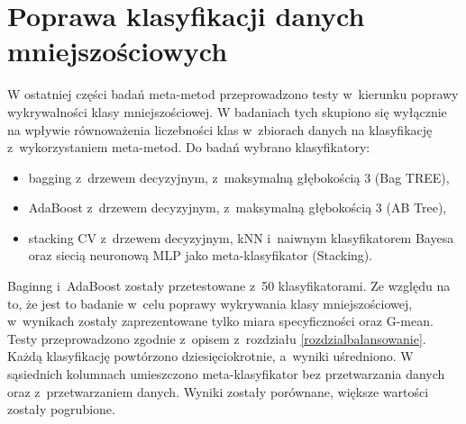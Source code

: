 \section{Poprawa klasyfikacji danych mniejszościowych}
W ostatniej części badań meta-metod przeprowadzono testy w~kierunku poprawy wykrywalności klasy mniejszościowej. W badaniach tych skupiono się wyłącznie na wpływie równoważenia liczebności klas w~zbiorach danych na klasyfikację z~wykorzystaniem meta-metod. Do badań wybrano klasyfikatory: 
\begin{itemize}
	\item bagging z~drzewem decyzyjnym, z~maksymalną głębokością 3 (Bag TREE),
	\item AdaBoost z~drzewem decyzyjnym, z~maksymalną głębokością 3 (AB Tree),
	\item stacking CV z~drzewem decyzyjnym, kNN i~naiwnym klasyfikatorem Bayesa oraz siecią neuronową MLP jako meta-klasyfikator (Stacking).
\end{itemize}
Baginng i~AdaBoost zostały przetestowane z~50 klasyfikatorami. Ze względu na to, że jest to badanie w~celu poprawy wykrywania klasy mniejszościowej, w~wynikach zostały zaprezentowane tylko miara specyficzności oraz G-mean. Testy przeprowadzono zgodnie z~opisem z~rozdziału \ref{rozdzialbalansowanie}. Każdą klasyfikację powtórzono dziesięciokrotnie, a~wyniki uśredniono. W sąsiednich kolumnach umieszczono meta-klasyfikator bez przetwarzania danych oraz z~przetwarzaniem danych. Wyniki zostały porównane, większe wartości zostały pogrubione.
